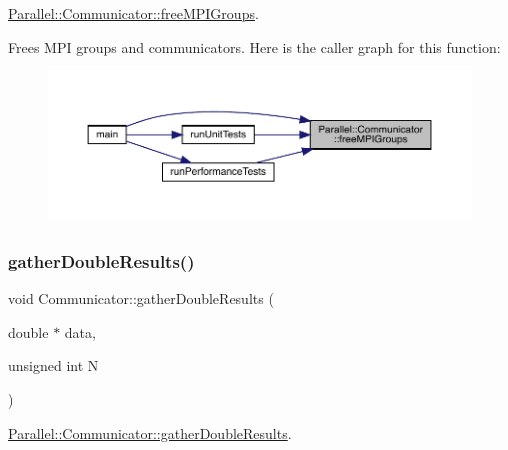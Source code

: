 \mbox{\hyperlink{class_parallel_1_1_communicator_aca0ac979aee1a649dbe5d4582b06a707}{Parallel\+::\+Communicator\+::free\+M\+P\+I\+Groups}}. 

Frees M\+PI groups and communicators. Here is the caller graph for this function\+:
\nopagebreak
\begin{figure}[H]
\begin{center}
\leavevmode
\includegraphics[width=350pt]{class_parallel_1_1_communicator_aca0ac979aee1a649dbe5d4582b06a707_icgraph}
\end{center}
\end{figure}
\mbox{\label{class_parallel_1_1_communicator_ae5739683ff54a7c39af6e37920e70ea5}} 
\subsubsection{\texorpdfstring{gatherDoubleResults()}{gatherDoubleResults()}}
{\footnotesize\ttfamily void Communicator\+::gather\+Double\+Results (\begin{DoxyParamCaption}\item[{double $\ast$}]{data,  }\item[{unsigned int}]{N }\end{DoxyParamCaption})\hspace{0.3cm}{\ttfamily [static]}}



\mbox{\hyperlink{class_parallel_1_1_communicator_ae5739683ff54a7c39af6e37920e70ea5}{Parallel\+::\+Communicator\+::gather\+Double\+Results}}. 


